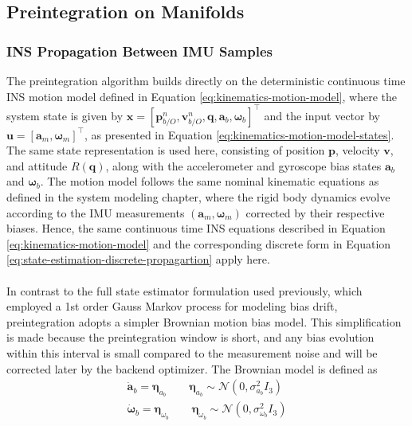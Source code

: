 \subsection{Preintegration on Manifolds}
\subsubsection{INS Propagation Between IMU Samples}
The preintegration algorithm builds directly on the deterministic continuous time INS motion model defined in Equation \ref{eq:kinematics-motion-model}, where the system state is given by $\mathbf{x} = [\mathbf{p}_{b/O}^{n}, \mathbf{v}_{b/O}^{n}, \mathbf{q}, \mathbf{a}_b, \boldsymbol{\omega}_b]^\top$ and the input vector by $\mathbf{u} = [\mathbf{a}_m, \boldsymbol{\omega}_m]^\top$, as presented in Equation \ref{eq:kinematics-motion-model-states}. The same state representation is used here, consisting of position $\mathbf{p}$, velocity $\mathbf{v}$, and attitude $R(\mathbf{q})$, along with the accelerometer and gyroscope bias states $\mathbf{a}_b$ and $\boldsymbol{\omega}_b$. The motion model follows the same nominal kinematic equations as defined in the system modeling chapter, where the rigid body dynamics evolve according to the IMU measurements $(\mathbf{a}_m, \boldsymbol{\omega}_m)$ corrected by their respective biases. Hence, the same continuous time INS equations described in Equation \ref{eq:kinematics-motion-model} and the corresponding discrete form in Equation \ref{eq:state-estimation-discrete-propagartion} apply here.
\\ \\
In contrast to the full state estimator formulation used previously, which employed a 1st order Gauss Markov process for modeling bias drift, preintegration adopts a simpler Brownian motion bias model. This simplification is made because the preintegration window is short, and any bias evolution within this interval is small compared to the measurement noise and will be corrected later by the backend optimizer. The Brownian model is defined as
\begin{equation}
    \begin{aligned}
        \dot{\mathbf{a}}_b = \boldsymbol{\eta}_{a_b} \qquad \boldsymbol{\eta}_{a_b} \sim \mathcal{N}(0, \sigma_{a_b}^2 I_3) \\
        \dot{\boldsymbol{\omega}}_b = \boldsymbol{\eta}_{\omega_b} \qquad \boldsymbol{\eta}_{\omega_b} \sim \mathcal{N}(0, \sigma_{\omega_b}^2 I_3)
    \end{aligned}
    \label{eq:preintegration-bias-brownian-model}
\end{equation}
